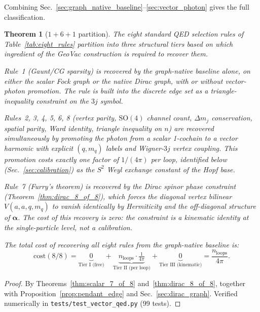 \documentclass[11pt]{article}
\newtheorem{theorem}{Theorem}
\begin{document}
Combining Sec.~\ref{sec:graph_native_baseline}--\ref{sec:vector_photon}
gives the full classification.

\begin{theorem}[$1{+}6{+}1$ partition]
\label{thm:partition}
The eight standard QED selection rules of Table~\ref{tab:eight_rules}
partition into three structural tiers based on which ingredient of
the GeoVac construction is required to recover them.

\begin{description}\setlength{\itemsep}{4pt}
\item[Tier I (graph topology, 1 rule).]  Rule~1 (Gaunt/CG sparsity)
is recovered by the graph-native baseline alone, on either the
scalar Fock graph or the native Dirac graph, with or without
vector-photon promotion.  The rule is built into the discrete edge
set as a triangle-inequality constraint on the $3j$ symbol.

\item[Tier II (angular momentum, 6 rules).]  Rules~2, 3, 4, 5, 6, 8
(vertex parity, $\mathrm{SO}(4)$ channel count, $\Delta m_j$
conservation, spatial parity, Ward identity, triangle inequality on
$n$) are recovered \emph{simultaneously} by promoting the photon
from a scalar 1-cochain to a vector harmonic with explicit
$(q, m_q)$ labels and Wigner-$3j$ vertex coupling.  This promotion
costs exactly one factor of $1/(4\pi)$ per loop, identified below
(Sec.~\ref{sec:calibration}) as the $S^2$ Weyl exchange constant of
the Hopf base.

\item[Tier III (Dirac kinematic, 1 rule).]  Rule~7 (Furry's theorem)
is recovered by the Dirac spinor phase constraint
(Theorem~\ref{thm:dirac_8_of_8}), which forces the diagonal vertex
bilinear $V(a, a, q, m_q)$ to vanish identically by Hermiticity and
the off-diagonal structure of $\boldsymbol{\alpha}$.  The cost of
this recovery is zero: the constraint is a kinematic identity at the
single-particle level, not a calibration.
\end{description}

The total cost of recovering all eight rules from the graph-native
baseline is:
\[
   \text{cost}(8/8) = \underbrace{0}_{\text{Tier I (free)}}
   + \underbrace{n_{\mathrm{loops}} \cdot \tfrac{1}{4\pi}}_{\text{Tier II (per loop)}}
   + \underbrace{0}_{\text{Tier III (kinematic)}}
   = \frac{n_{\mathrm{loops}}}{4\pi}.
\]
\end{theorem}

\begin{proof}
By Theorems~\ref{thm:scalar_7_of_8} and~\ref{thm:dirac_8_of_8},
together with Proposition~\ref{prop:pendant_edge} and
Sec.~\ref{sec:dirac_graph}.  Verified numerically in
\texttt{tests/test\_vector\_qed.py} (99 tests).
\end{proof}
\end{document}
